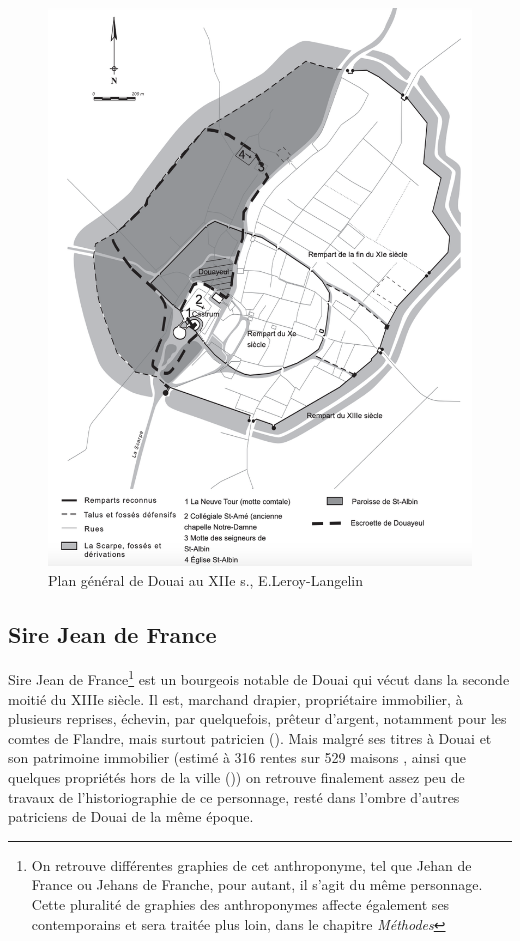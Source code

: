 \begin{figure}[ht] %
    \centering
    \includegraphics[scale=1]{1.Introduction/Img/Plan général de la ville de Douai avec les enceintes successives. DAO : E. Leroy-Langelin.png} 
    \caption{Plan général de Douai au XIIe s., E.Leroy-Langelin}
\end{figure}

\subsection{Sire Jean de France}
Sire Jean de France\footnote{On retrouve différentes graphies de cet anthroponyme, tel que \og Jehan de France\fg{} ou \og Jehans de Franche\fg{}, pour autant, il s'agit du même personnage. Cette pluralité de graphies des anthroponymes affecte également ses contemporains et sera traitée plus loin, dans le chapitre \textit{Méthodes}} est un bourgeois notable de Douai qui vécut dans la seconde moitié du XIIIe siècle. Il est, marchand drapier, propriétaire immobilier, à plusieurs reprises, échevin, par quelquefois, prêteur d'argent, notamment pour les comtes de Flandre, mais surtout patricien (\cite{espinas_les_1933}). 
Mais malgré ses titres à Douai et son patrimoine immobilier (estimé à 316 rentes sur 529 maisons , ainsi que quelques propriétés hors de la ville (\cite{blockmans_trois_1941})) on retrouve finalement assez peu de travaux de l'historiographie de ce personnage, resté dans l'ombre d'autres patriciens de Douai de la même époque.

